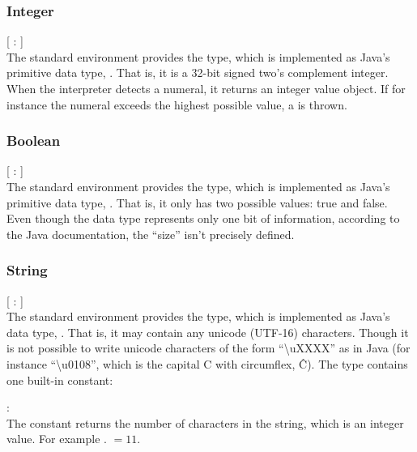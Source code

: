 \subsubsection{Integer}

\begin{dlist}
  \item {}[ : ]\\
    The standard environment provides the  type, which is
    implemented as Java's primitive data type, . That is, it is a 32-bit
    signed two's complement integer. When the interpreter detects a numeral, it
    returns an integer value object. If for instance the numeral exceeds the
    highest possible value, a  is thrown.
\end{dlist}

\subsubsection{Boolean}

\begin{dlist}
  \item {}[ : ]\\
    The standard environment provides the  type, which is
    implemented as Java's primitive data type, . That is, it only has two
    possible values: true and false. Even though the data type represents only
    one bit of information, according to the Java documentation, the ``size''
    isn't precisely defined. 
\end{dlist}

\subsubsection{String}
\begin{dlist}
  \item {}[ : ]\\
    The standard environment provides the  type, which is
    implemented as Java's data type, . That is, it may contain
    any unicode (UTF-16) characters. Though it is not possible to write unicode
    characters of the form ``\textbackslash{}uXXXX'' as in Java (for instance
    ``\textbackslash{}u0108'', which is the capital C with circumflex, Ĉ). The
     type contains one built-in constant:  
  \begin{dlist}
  \item {} : \\
    The  constant returns the number of characters in the string,
    which is an integer value. For example . 
    $= 11$.
  \end{dlist}
\end{dlist}

